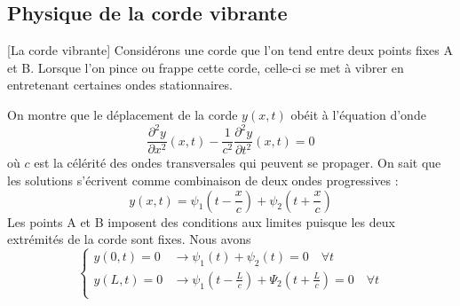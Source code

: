 \subsection{Physique de la corde vibrante}[La corde vibrante] %
Considérons une corde que l'on tend entre deux points fixes A et B. Lorsque l'on pince ou frappe cette corde, celle-ci se met à vibrer en entretenant certaines ondes stationnaires.
\begin{marginfigure}[*-3]
\centering
{}
\end{marginfigure}
On montre que le déplacement de la corde \(y(x,t)\) obéit à l'équation d'onde 
\[
\frac{\partial^{2}y}{\partial x^{2}}(x,t)-\frac{1}{c^{2}}\frac{\partial^{2}y}{\partial t^{2}}(x,t)=0
\]
où \(c\) est la célérité des ondes transversales qui peuvent se propager. On sait que les solutions s'écrivent comme combinaison de deux ondes progressives : 
\begin{equation}
	y(x,t)=\psi_{1}\left(t-\frac{x}{c}\right)+\psi_{2}\left(t+\frac{x}{c}\right)
	\label{solution_equation_d_onde}
\end{equation}
Les points A et B imposent des conditions aux limites puisque les deux extrémités de la corde sont fixes. Nous avons
\begin{equation}
	\begin{cases}
		y(0,t)=0& \to \psi_{1}(t)+\psi_{2}(t)=0\quad \forall t\\
		y(L,t)=0& \to \psi_{1}\left(t-\frac{L}{c}\right)+\Psi_{2}\left(t+\frac{L}{c}\right)=0\quad \forall t\\
	\end{cases}
\end{equation}
